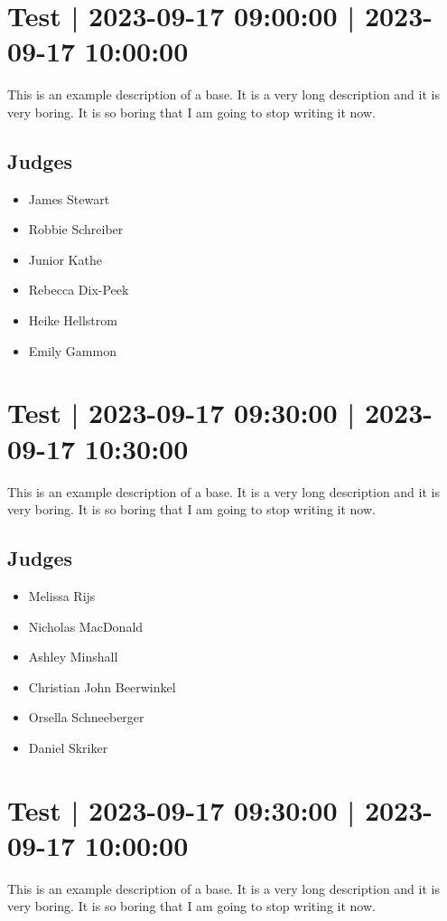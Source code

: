 \documentclass[10pt]{article}
\begin{document}
			\setcounter{section}{33}
	\section{Test | 2023-09-17 09:00:00 | 2023-09-17 10:00:00}
	This is an example description of a base. It is a very long description and it is very boring. It is so boring that I am going to stop writing it now.

	\subsection*{Judges}
	\begin{itemize}

			\item James Stewart
			\item Robbie Schreiber
			\item Junior Kathe
			\item Rebecca Dix-Peek
			\item Heike Hellstrom
			\item Emily Gammon
		\end{itemize}

			\setcounter{section}{34}
	\section{Test | 2023-09-17 09:30:00 | 2023-09-17 10:30:00}
	This is an example description of a base. It is a very long description and it is very boring. It is so boring that I am going to stop writing it now.

	\subsection*{Judges}
	\begin{itemize}

			\item Melissa Rijs
			\item Nicholas MacDonald
			\item Ashley Minshall
			\item Christian John Beerwinkel
			\item Orsella Schneeberger
			\item Daniel Skriker
		\end{itemize}

			\setcounter{section}{35}
	\section{Test | 2023-09-17 09:30:00 | 2023-09-17 10:00:00}
	This is an example description of a base. It is a very long description and it is very boring. It is so boring that I am going to stop writing it now.
\end{document}
